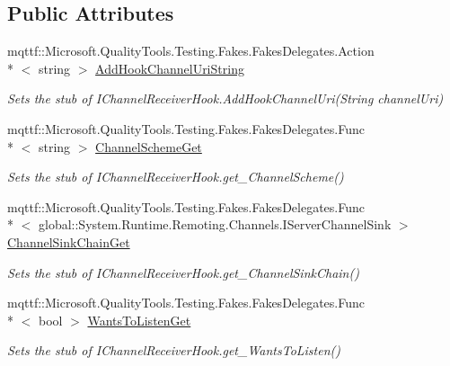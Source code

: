 \subsection*{Public Attributes}
\begin{DoxyCompactItemize}
\item 
mqttf\-::\-Microsoft.\-Quality\-Tools.\-Testing.\-Fakes.\-Fakes\-Delegates.\-Action\\*
$<$ string $>$ \hyperlink{class_system_1_1_runtime_1_1_remoting_1_1_channels_1_1_fakes_1_1_stub_i_channel_receiver_hook_ab6cc01fadf30a27cd083f2b431df8779}{Add\-Hook\-Channel\-Uri\-String}
\begin{DoxyCompactList}\small\item\em Sets the stub of I\-Channel\-Receiver\-Hook.\-Add\-Hook\-Channel\-Uri(\-String channel\-Uri)\end{DoxyCompactList}\item 
mqttf\-::\-Microsoft.\-Quality\-Tools.\-Testing.\-Fakes.\-Fakes\-Delegates.\-Func\\*
$<$ string $>$ \hyperlink{class_system_1_1_runtime_1_1_remoting_1_1_channels_1_1_fakes_1_1_stub_i_channel_receiver_hook_a50e3aa611611d0d21830349ea4b9bbf0}{Channel\-Scheme\-Get}
\begin{DoxyCompactList}\small\item\em Sets the stub of I\-Channel\-Receiver\-Hook.\-get\-\_\-\-Channel\-Scheme()\end{DoxyCompactList}\item 
mqttf\-::\-Microsoft.\-Quality\-Tools.\-Testing.\-Fakes.\-Fakes\-Delegates.\-Func\\*
$<$ global\-::\-System.\-Runtime.\-Remoting.\-Channels.\-I\-Server\-Channel\-Sink $>$ \hyperlink{class_system_1_1_runtime_1_1_remoting_1_1_channels_1_1_fakes_1_1_stub_i_channel_receiver_hook_a66a8dce38a4c3035b796e6655844c273}{Channel\-Sink\-Chain\-Get}
\begin{DoxyCompactList}\small\item\em Sets the stub of I\-Channel\-Receiver\-Hook.\-get\-\_\-\-Channel\-Sink\-Chain()\end{DoxyCompactList}\item 
mqttf\-::\-Microsoft.\-Quality\-Tools.\-Testing.\-Fakes.\-Fakes\-Delegates.\-Func\\*
$<$ bool $>$ \hyperlink{class_system_1_1_runtime_1_1_remoting_1_1_channels_1_1_fakes_1_1_stub_i_channel_receiver_hook_a76e2054f610ae9099bb86cefab806d7b}{Wants\-To\-Listen\-Get}
\begin{DoxyCompactList}\small\item\em Sets the stub of I\-Channel\-Receiver\-Hook.\-get\-\_\-\-Wants\-To\-Listen()\end{DoxyCompactList}\end{DoxyCompactItemize}


